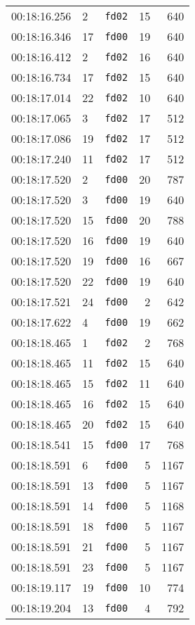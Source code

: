 \documentclass{article}
\begin{document}
\begin{longtable}{lllrr}
00:18:16.256 & 2 & \texttt{fd02} & 15 & 640 \\
00:18:16.346 & 17 & \texttt{fd00} & 19 & 640 \\
00:18:16.412 & 2 & \texttt{fd02} & 16 & 640 \\
00:18:16.734 & 17 & \texttt{fd02} & 15 & 640 \\
00:18:17.014 & 22 & \texttt{fd02} & 10 & 640 \\
00:18:17.065 & 3 & \texttt{fd02} & 17 & 512 \\
00:18:17.086 & 19 & \texttt{fd02} & 17 & 512 \\
00:18:17.240 & 11 & \texttt{fd02} & 17 & 512 \\
00:18:17.520 & 2 & \texttt{fd00} & 20 & 787 \\
00:18:17.520 & 3 & \texttt{fd00} & 19 & 640 \\
00:18:17.520 & 15 & \texttt{fd00} & 20 & 788 \\
00:18:17.520 & 16 & \texttt{fd00} & 19 & 640 \\
00:18:17.520 & 19 & \texttt{fd00} & 16 & 667 \\
00:18:17.520 & 22 & \texttt{fd00} & 19 & 640 \\
00:18:17.521 & 24 & \texttt{fd00} & 2 & 642 \\
00:18:17.622 & 4 & \texttt{fd00} & 19 & 662 \\
00:18:18.465 & 1 & \texttt{fd02} & 2 & 768 \\
00:18:18.465 & 11 & \texttt{fd02} & 15 & 640 \\
00:18:18.465 & 15 & \texttt{fd02} & 11 & 640 \\
00:18:18.465 & 16 & \texttt{fd02} & 15 & 640 \\
00:18:18.465 & 20 & \texttt{fd02} & 15 & 640 \\
00:18:18.541 & 15 & \texttt{fd00} & 17 & 768 \\
00:18:18.591 & 6 & \texttt{fd00} & 5 & 1167 \\
00:18:18.591 & 13 & \texttt{fd00} & 5 & 1167 \\
00:18:18.591 & 14 & \texttt{fd00} & 5 & 1168 \\
00:18:18.591 & 18 & \texttt{fd00} & 5 & 1167 \\
00:18:18.591 & 21 & \texttt{fd00} & 5 & 1167 \\
00:18:18.591 & 23 & \texttt{fd00} & 5 & 1167 \\
00:18:19.117 & 19 & \texttt{fd00} & 10 & 774 \\
00:18:19.204 & 13 & \texttt{fd00} & 4 & 792 \\

\end{longtable}
\end{document}

